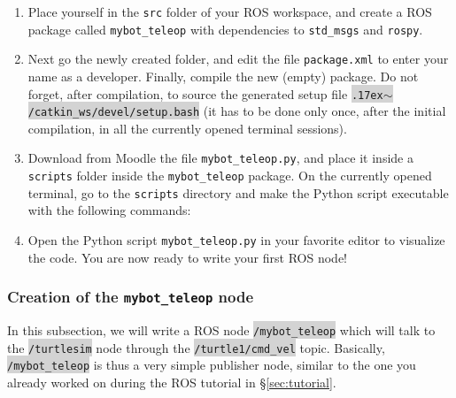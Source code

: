 \documentclass[10pt,a4paper,printanswers]{upmc}
\newcommand{\mytilde}{\raise.17ex\hbox{$\scriptstyle\mathtt{\sim}$}}
\newcounter{mainmemorder}
\newcommand{\save}{\setcounter{mainmemorder}{\value{enumi}}}
\newcommand{\load}{\setcounter{enumi}{\value{mainmemorder}}}
\newcommand{\mytext}[1]{\colorbox{lightgray}{\texttt{#1}}}
\begin{document}
\begin{enumerate}
  \load
  \item Place yourself in the \texttt{src} folder of your ROS workspace, and create a ROS package
        called \texttt{mybot\_teleop} with dependencies to \texttt{std\_msgs} and \texttt{rospy}.
  \item Next go the newly created folder, and edit the file \texttt{package.xml} to enter your name
        as a developer. Finally, compile the new (empty) package. Do not forget, after compilation,
        to source the generated setup file \mytext{\mytilde/catkin\_ws/devel/setup.bash} (it has to
        be done only once, after the initial compilation, in all the currently opened terminal
        sessions).
  \item \label{item:executable}Download from Moodle the file \texttt{mybot\_teleop.py}, and place it
        inside a \texttt{scripts} folder inside the \texttt{mybot\_teleop} package. On the currently
        opened terminal, go to the \texttt{scripts} directory and make the Python script executable
        with the following commands: 
  \item Open the Python script \texttt{mybot\_teleop.py} in your favorite editor to visualize the
        code. You are now ready to write your first ROS node!
        \save
\end{enumerate}

\subsubsection{Creation of the \texttt{mybot\_teleop} node}
In this subsection, we will write a ROS node \mytext{/mybot\_teleop} which will talk to the
\mytext{/turtlesim} node through the \mytext{/turtle1/cmd\_vel} topic. Basically,
\mytext{/mybot\_teleop} is thus a very simple publisher node, similar to the one you already worked
on during the ROS tutorial in \S\ref{sec:tutorial}.
\end{document}
